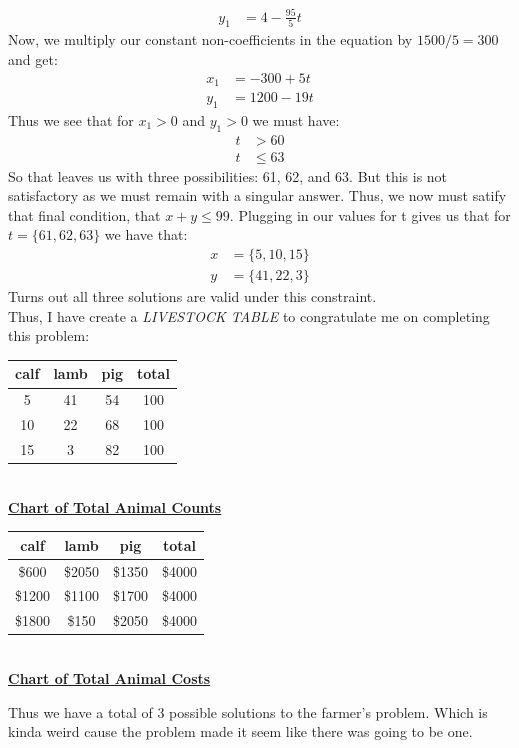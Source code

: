 \documentclass[10pt,oneside]{book}
\newcommand{\gspc}{\vspace{0.13cm}} %
\newcommand{\gline}{\gspc\\} %
\newcommand{\gbline}{\gspc\gspc\\} %
\newcommand{\ul}[1]{\underline{#1}}
\begin{document}
\begin{enumerate}
\begin{align*}
		y_1 &= 4 - \frac{95}5t
	\end{align*} 
	Now, we multiply our constant non-coefficients in the equation by $1500/5 = 300$ and get:
	\begin{align*}
		x_1 &= -300 + 5t\\
		y_1 &= 1200 - 19t
	\end{align*}
	Thus we see that for $x_1> 0$ and $y_1>0$ we must have:
	\begin{align*}
		t &> 60\\
		t &\le 63
	\end{align*}
	So that leaves us with three possibilities: 61, 62, and 63. But this is not satisfactory as we must remain with a singular answer. Thus, we now must satify that final condition, that $x+y \le 99$.
	\pagebreak
	Plugging in our values for t gives us that for $t = \{61, 62, 63\}$ we have that:
	\begin{align*}
		x &= \{5, 10, 15\}\\
		y &= \{41, 22, 3\}
	\end{align*} 
	Turns out all three solutions are valid under this constraint.\\
	Thus, I have create a \textit{LIVESTOCK TABLE} to congratulate me on completing this problem:
	\begin{center}
		\begin{tabular}{c|c|c|c}
			calf & lamb & pig & total\\\hline
			5 & 41 & 54 & 100\\\hline
			10 & 22 & 68 & 100\\\hline
			15 & 3 & 82 & 100\\\hline
		\end{tabular}\gline
		\ul{\textbf{Chart of Total Animal Counts}}\gbline
		\begin{tabular}{c|c|c|c}
			calf & lamb & pig & total\\\hline
			\$600 & \$2050 & \$1350 & \$4000\\\hline
			\$1200 & \$1100 & \$1700 & \$4000\\\hline
			\$1800 & \$150 & \$2050 & \$4000\\\hline
		\end{tabular}\gline
		\ul{\textbf{Chart of Total Animal Costs}}
	\end{center}
	Thus we have a total of 3 possible solutions to the farmer's problem. Which is kinda weird cause the problem made it seem like there was going to be one. 
\end{enumerate}
\end{document}
